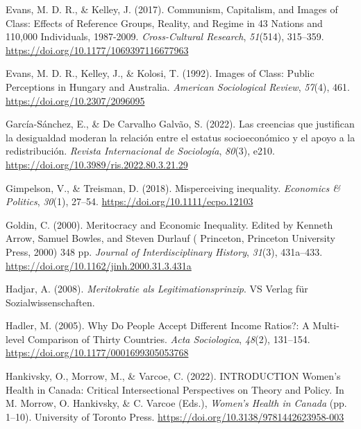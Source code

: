 \documentclass[
  12pt,
  a4paper,
]{article}
\newlength{\cslhangindent}
\newenvironment{CSLReferences}[2] %
 {%
  \setlength{\parindent}{0pt}
  \ifodd #1 \everypar{\setlength{\hangindent}{\cslhangindent}}\ignorespaces\fi
  \ifnum #2 > 0
  \setlength{\parskip}{#2\baselineskip}
  \fi
 }%
 {}
\begin{document}
\begin{CSLReferences}{1}{0}
Evans, M. D. R., \& Kelley, J. (2017). Communism, {Capitalism}, and {Images} of {Class}: {Effects} of {Reference Groups}, {Reality}, and {Regime} in 43 {Nations} and 110,000 {Individuals}, 1987-2009. \emph{Cross-Cultural Research}, \emph{51}(514), 315--359. \url{https://doi.org/10.1177/1069397116677963}

Evans, M. D. R., Kelley, J., \& Kolosi, T. (1992). Images of {Class}: {Public Perceptions} in {Hungary} and {Australia}. \emph{American Sociological Review}, \emph{57}(4), 461. \url{https://doi.org/10.2307/2096095}

García-Sánchez, E., \& De Carvalho Galvão, S. (2022). Las creencias que justifican la desigualdad moderan la relaci{ó}n entre el estatus socioecon{ó}mico y el apoyo a la redistribuci{ó}n. \emph{Revista Internacional de Sociolog{í}a}, \emph{80}(3), e210. \url{https://doi.org/10.3989/ris.2022.80.3.21.29}

Gimpelson, V., \& Treisman, D. (2018). Misperceiving inequality. \emph{Economics \& Politics}, \emph{30}(1), 27--54. \url{https://doi.org/10.1111/ecpo.12103}

Goldin, C. (2000). Meritocracy and {Economic Inequality}. {Edited} by {Kenneth Arrow}, {Samuel Bowles}, and {Steven Durlauf} ( {Princeton}, {Princeton University Press}, 2000) 348 pp. \emph{Journal of Interdisciplinary History}, \emph{31}(3), 431a--433. \url{https://doi.org/10.1162/jinh.2000.31.3.431a}

Hadjar, A. (2008). \emph{{Meritokratie als Legitimationsprinzip}}. VS Verlag f{ü}r Sozialwissenschaften.

Hadler, M. (2005). Why {Do People Accept Different Income Ratios}?: {A Multi-level Comparison} of {Thirty Countries}. \emph{Acta Sociologica}, \emph{48}(2), 131--154. \url{https://doi.org/10.1177/0001699305053768}

Hankivsky, O., Morrow, M., \& Varcoe, C. (2022). {INTRODUCTION Women}'s {Health} in {Canada}: {Critical Intersectional Perspectives} on {Theory} and {Policy}. In M. Morrow, O. Hankivsky, \& C. Varcoe (Eds.), \emph{Women's {Health} in {Canada}} (pp. 1--10). University of Toronto Press. \url{https://doi.org/10.3138/9781442623958-003}


\end{CSLReferences}
\end{document}
